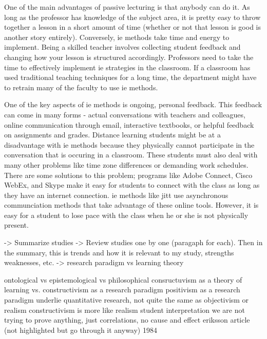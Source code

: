 One of the main advantages of passive lecturing is that anybody can do it. As long as the professor has knowledge of the subject area, it is pretty easy to throw together a lesson in a short amount of time (whether or not that lesson is good is another story entirely). Conversely, \gls{ie} methods take time and energy to implement. Being a skilled teacher involves collecting student feedback and changing how your lesson is structured accordingly. Professors need to take the time to effectively implement \gls{ie} strategies in the classroom. If a classroom has used traditional teaching techniques for a long time, the department might have to retrain many of the faculty to use \gls{ie} methods.

One of the key aspects of \gls{ie} methods is ongoing, personal feedback. This feedback can come in many forms - actual conversations with teachers and colleagues, online communication through email, interactive textbooks, or helpful feedback on assignments and grades. Distance learning students might be at a disadvantage with \gls{ie} methods because they physically cannot participate in the conversation that is occuring in a classroom. These students must also deal with many other problems like time zone differences or demanding work schedules. There are some solutions to this problem; programs like Adobe Connect, Cisco WebEx, and Skype make it easy for students to connect with the class as long as they have an internet connection. \gls{ie} methods like \gls{jitt} use asynchronous communciation methods that take advantage of these online tools. However, it is easy for a student to lose pace with the class when he or she is not physically present.

-> Summarize studies
-> Review studies one by one (paragaph for each). Then in the summary, this is trends and how it is relevant to my study, strengths weaknesses, etc.
-> research paradigm vs learning theory

ontological vs epistemological vs philosophical
consructuvism as a theory of learning vs. constructivism as a research paradigm
positivism as a research paradigm underlie quantitative research, not quite the same as objectivism or realism
constructivism is more like realism
student interpretation
we are not trying to prove anything, just correlations, no cause and effect
eriksson article (not highlighted but go through it anyway) 1984


